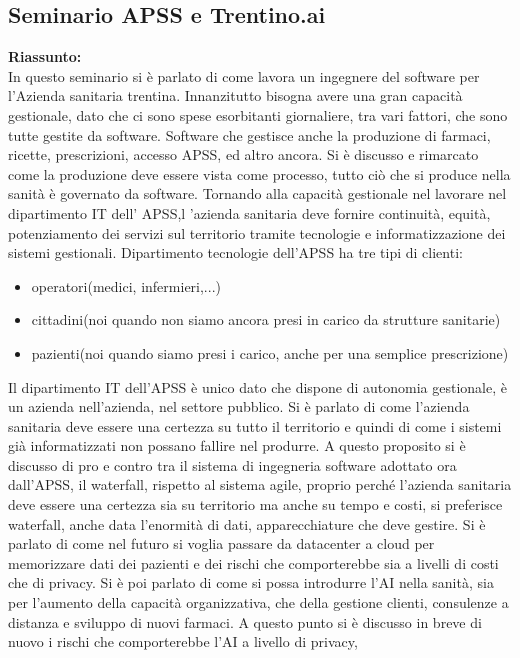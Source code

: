 \documentclass{article}
\begin{document}
\subsection{Seminario APSS e  Trentino.ai}
\textbf{Riassunto:}
\\
In questo seminario si è parlato di come lavora un ingegnere del software per l'Azienda
sanitaria trentina.
Innanzitutto bisogna avere una gran capacità gestionale, dato che ci sono spese esorbitanti
giornaliere, tra vari fattori, che sono tutte gestite da software.
Software che gestisce anche la produzione di farmaci, ricette, prescrizioni, accesso APSS, ed
altro ancora.
Si è discusso e rimarcato come la produzione deve essere vista come processo, tutto ciò che si
produce nella sanità è governato da software.
Tornando alla capacità gestionale nel lavorare nel dipartimento IT dell' APSS,l 'azienda sanitaria
deve fornire continuità, equità, potenziamento dei servizi sul territorio tramite tecnologie e
informatizzazione dei sistemi gestionali.
Dipartimento tecnologie dell'APSS ha tre tipi di clienti:
\begin{itemize}
    \item operatori(medici, infermieri,...)
    \item cittadini(noi quando non siamo ancora presi in carico da strutture sanitarie)
    \item pazienti(noi quando siamo presi i carico, anche per una semplice prescrizione)
\end{itemize}
Il dipartimento IT dell'APSS è unico dato che dispone di autonomia gestionale, è un azienda
nell'azienda, nel settore pubblico.
Si è parlato di come l'azienda sanitaria deve essere una certezza su tutto il territorio e quindi di
come i sistemi già informatizzati non possano fallire nel produrre. A questo proposito si è
discusso di pro e contro tra il sistema di ingegneria software adottato ora dall'APSS,
il waterfall,
rispetto al sistema agile, proprio perché l'azienda sanitaria deve essere una certezza sia su
territorio ma anche su tempo e costi, si preferisce waterfall, anche data l'enormità di dati,
apparecchiature che deve gestire.
Si è parlato di come nel futuro si voglia passare da datacenter a cloud per memorizzare dati dei
pazienti e dei rischi che comporterebbe sia a livelli di costi che di privacy.
Si è poi parlato di come si possa introdurre l'AI nella sanità, sia per l'aumento della capacità
organizzativa, che della gestione clienti, consulenze a distanza e sviluppo di nuovi farmaci. A
questo punto si è discusso in breve di nuovo i rischi che comporterebbe l'AI a livello di privacy,
\end{document}
